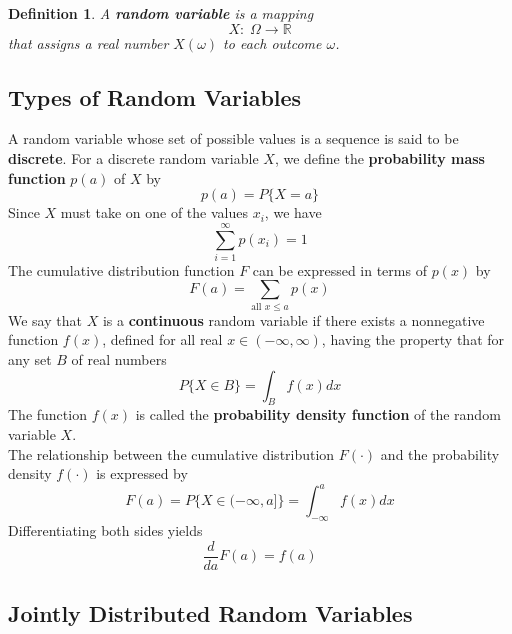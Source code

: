 \documentclass[12pt]{article}
\newtheorem{definition}[theorem]{Definition}
\begin{document}
\begin{definition}
  A \textbf{random variable} is a mapping
  \begin{equation*}
    X: \; \Omega \rightarrow \mathbb{R}
  \end{equation*}
  that assigns a real number $X(\omega)$ to each outcome $\omega$.
\end{definition}

\subsection{Types of Random Variables}

A random variable whose set of possible values is a sequence is said to be \textbf{discrete}. For a discrete random variable $X$, we define the \textbf{probability mass function} $p(a)$ of $X$ by
\begin{equation*}
  p(a) = P\{X = a\}
\end{equation*}
Since $X$ must take on one of the values $x_i$, we have
\begin{equation*}
  \sum_{i=1}^{\infty} p(x_i) = 1
\end{equation*}
The cumulative distribution function $F$ can be expressed in terms of $p(x)$ by
\begin{equation*}
  F(a) = \sum_{\text{all } x \le a} p(x)
\end{equation*}
We say that $X$ is a \textbf{continuous} random variable if there exists a nonnegative function $f(x)$, defined for all real $x \in (-\infty, \infty)$, having the property that for any set $B$ of real numbers
\begin{equation*}
  P\{X \in B\} = \int_B f(x) dx
\end{equation*}
The function $f(x)$ is called the \textbf{probability density function} of the random variable $X$. \\

The relationship between the cumulative distribution $F(\cdot)$ and the probability density $f(\cdot)$ is expressed by
\begin{equation*}
  F(a) = P\{X \in (-\infty,a ]\} = \int_{-\infty}^a f(x) dx
\end{equation*}
Differentiating both sides yields
\begin{equation*}
  \frac {d}{da}F(a) = f(a)
\end{equation*}

\subsection{Jointly Distributed Random Variables}
\end{document}
